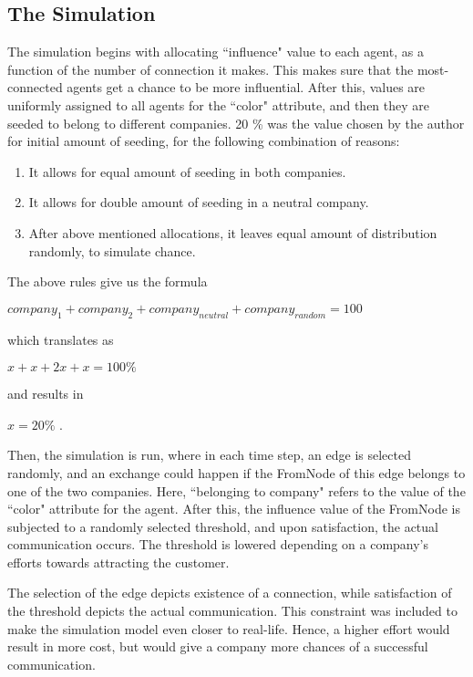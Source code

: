 \subsection{The Simulation} 
 
The simulation begins with allocating ``influence" value to each agent, as a function of the number of connection it makes. This makes sure that the most-connected agents get a chance to be more influential. 
After this, values are uniformly assigned to all agents for the ``color" attribute, and then they are seeded to belong to different companies. 20 \% was the value chosen by the author for initial amount of seeding, for the following combination of reasons:

\begin{enumerate}
\item It allows for equal amount of seeding in both companies.
\item It allows for double amount of seeding in a neutral company.
\item After above mentioned allocations, it leaves equal amount of distribution randomly, to simulate chance.
\end{enumerate}

The above rules give us the formula

$company_1 + company_2 + company_{neutral} + company_{random} = 100$

which translates as

$x + x + 2x + x = 100 \%$

and results in 

$x = 20 \%$ .

Then, the simulation is run, where in each time step, an edge is selected randomly, and an exchange could happen if the FromNode of this edge belongs to one of the two companies. Here, ``belonging to company" refers to the value of the ``color" attribute for the agent.
After this, the influence value of the FromNode is subjected to a randomly selected threshold, and upon satisfaction, the actual communication occurs. The threshold is lowered depending on a company's efforts towards attracting the customer. 

The selection of the edge depicts existence of a connection, while satisfaction of the threshold depicts the actual communication. This constraint was included to make the simulation model even closer to real-life. 
Hence, a higher effort would result in more cost, but would give a company more chances of a successful communication.

